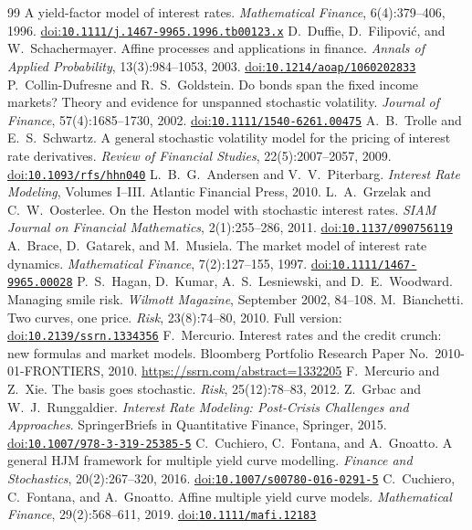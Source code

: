 \documentclass[11pt]{article}
\newcommand{\doi}[1]{\href{https://doi.org/#1}{doi:\nolinkurl{#1}}}
\begin{document}
\begin{thebibliography}{99}
  A yield-factor model of interest rates.
  \emph{Mathematical Finance}, 6(4):379--406, 1996. \doi{10.1111/j.1467-9965.1996.tb00123.x}
 D.~Duffie, D.~Filipovi\'{c}, and W.~Schachermayer.
  Affine processes and applications in finance.
  \emph{Annals of Applied Probability}, 13(3):984--1053, 2003. \doi{10.1214/aoap/1060202833}
 P.~Collin-Dufresne and R.~S.~Goldstein.
  Do bonds span the fixed income markets? Theory and evidence for unspanned stochastic volatility.
  \emph{Journal of Finance}, 57(4):1685--1730, 2002. \doi{10.1111/1540-6261.00475}
 A.~B.~Trolle and E.~S.~Schwartz.
  A general stochastic volatility model for the pricing of interest rate derivatives.
  \emph{Review of Financial Studies}, 22(5):2007--2057, 2009. \doi{10.1093/rfs/hhn040}
 L.~B.~G.~Andersen and V.~V.~Piterbarg.
  \emph{Interest Rate Modeling}, Volumes I--III. Atlantic Financial Press, 2010.
 L.~A.~Grzelak and C.~W.~Oosterlee.
  On the Heston model with stochastic interest rates.
  \emph{SIAM Journal on Financial Mathematics}, 2(1):255--286, 2011. \doi{10.1137/090756119}
 A.~Brace, D.~Gatarek, and M.~Musiela.
  The market model of interest rate dynamics.
  \emph{Mathematical Finance}, 7(2):127--155, 1997. \doi{10.1111/1467-9965.00028}
 P.~S.~Hagan, D.~Kumar, A.~S.~Lesniewski, and D.~E.~Woodward.
  Managing smile risk.
  \emph{Wilmott Magazine}, September 2002, 84--108.
 M.~Bianchetti.
  Two curves, one price.
  \emph{Risk}, 23(8):74--80, 2010. Full version: \doi{10.2139/ssrn.1334356}
 F.~Mercurio.
  Interest rates and the credit crunch: new formulas and market models.
  Bloomberg Portfolio Research Paper No.\ 2010-01-FRONTIERS, 2010.
  \url{https://ssrn.com/abstract=1332205}
 F.~Mercurio and Z.~Xie.
  The basis goes stochastic.
  \emph{Risk}, 25(12):78--83, 2012.
 Z.~Grbac and W.~J.~Runggaldier.
  \emph{Interest Rate Modeling: Post-Crisis Challenges and Approaches}.
  SpringerBriefs in Quantitative Finance, Springer, 2015. \doi{10.1007/978-3-319-25385-5}
 C.~Cuchiero, C.~Fontana, and A.~Gnoatto.
  A general {HJM} framework for multiple yield curve modelling.
  \emph{Finance and Stochastics}, 20(2):267--320, 2016. \doi{10.1007/s00780-016-0291-5}
 C.~Cuchiero, C.~Fontana, and A.~Gnoatto.
  Affine multiple yield curve models.
  \emph{Mathematical Finance}, 29(2):568--611, 2019. \doi{10.1111/mafi.12183}

\end{thebibliography}
\end{document}
